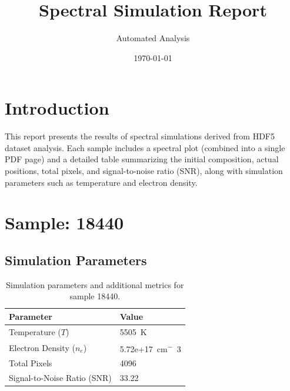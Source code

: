 \documentclass[a4paper,11pt]{article}
\title{Spectral Simulation Report}
\author{Automated Analysis}
\date{\today}
\begin{document}
\maketitle
\tableofcontents
\clearpage

\section{Introduction}
This report presents the results of spectral simulations derived from HDF5 dataset analysis. Each sample includes a spectral plot (combined into a single PDF page) and a detailed table summarizing the initial composition, actual positions, total pixels, and signal-to-noise ratio (SNR), along with simulation parameters such as temperature and electron density.


\section{Sample: 18440}
\subsection{Simulation Parameters}
\begin{table}[h!]
    \centering
    \begin{tabular}{ll}
        \toprule
        \textbf{Parameter} & \textbf{Value} \\
        \midrule
        Temperature ($T$) & 5505 \,\si{K} \\
        Electron Density ($n_e$) & 5.72e+17 \,\si{cm^-3} \\
        Total Pixels & 4096 \\
        Signal-to-Noise Ratio (SNR) & 33.22 \\
        \bottomrule
    \end{tabular}
    \caption{Simulation parameters and additional metrics for sample 18440.}
    \label{tab:params_18440}
\end{table}
\end{document}
